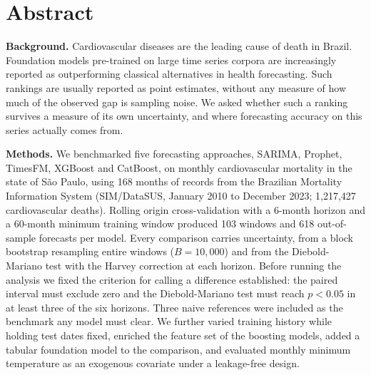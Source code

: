 
\section*{Abstract}

\noindent\textbf{Background.} Cardiovascular diseases are the leading cause of death in
Brazil. Foundation models pre-trained on large time series corpora are increasingly
reported as outperforming classical alternatives in health forecasting. Such rankings are
usually reported as point estimates, without any measure of how much of the observed gap
is sampling noise. We asked whether such a ranking survives a measure of its own
uncertainty, and where forecasting accuracy on this series actually comes from.

\noindent\textbf{Methods.} We benchmarked five forecasting approaches, SARIMA, Prophet,
TimesFM, XGBoost and CatBoost, on monthly cardiovascular mortality in the state of
S\~ao Paulo, using 168 months of records from the Brazilian Mortality Information System
(SIM/DataSUS, January 2010 to December 2023; 1{,}217{,}427 cardiovascular deaths).
Rolling origin cross-validation with a 6-month horizon and a 60-month minimum training
window produced 103 windows and 618 out-of-sample forecasts per model. Every comparison
carries uncertainty, from a block bootstrap resampling entire windows ($B=10{,}000$) and
from the Diebold-Mariano test with the Harvey correction at each horizon. Before running
the analysis we fixed the criterion for calling a difference established: the paired
interval must exclude zero and the Diebold-Mariano test must reach $p<0.05$ in at least
three of the six horizons. Three naive references were included as the benchmark any model
must clear. We further varied training history while holding test dates fixed, enriched
the feature set of the boosting models, added a tabular foundation model to the
comparison, and evaluated monthly minimum temperature as an exogenous covariate under a
leakage-free design.

